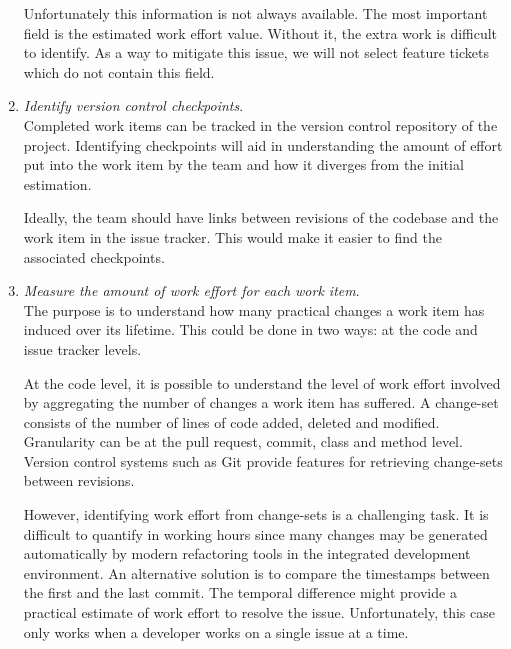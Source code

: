 \begin{enumerate}
	      Unfortunately this information is not always available. The most
	      important field is the estimated work effort value. Without it, the
	      extra work is difficult to identify. As a way to mitigate this
	      issue, we will not select feature tickets which do not contain this
	      field.

	\item \textit{Identify version control checkpoints}.\\
	      Completed work items can be tracked in the version control
	      repository of the project. Identifying checkpoints will aid in
	      understanding the amount of effort put into the work item by the
	      team and how it diverges from the initial estimation.

	      Ideally, the team should have links between revisions of the
	      codebase and the work item in the issue tracker. This would make it
	      easier to find the associated checkpoints.

	\item \textit{Measure the amount of work effort for each work item}.\\
	      The purpose is to understand how many practical changes a work item
	      has induced over its lifetime. This could be done in two ways: at
	      the code and issue tracker levels.

	      At the code level, it is possible to understand the level of work
	      effort involved by aggregating the number of changes a work item has
	      suffered. A change-set consists of the number of lines of code
	      added, deleted and modified. Granularity can be at the pull request,
	      commit, class and method level. Version control systems such as Git
	      provide features for retrieving change-sets between revisions.

	      However, identifying work effort from change-sets is a challenging
	      task. It is difficult to quantify in working hours since many
	      changes may be generated automatically by modern refactoring tools
	      in the integrated development environment. An alternative solution
	      is to compare the timestamps between the first and the last commit.
	      The temporal difference might provide a practical estimate of work
	      effort to resolve the issue. Unfortunately, this case only works
	      when a developer works on a single issue at a time.


\end{enumerate}
